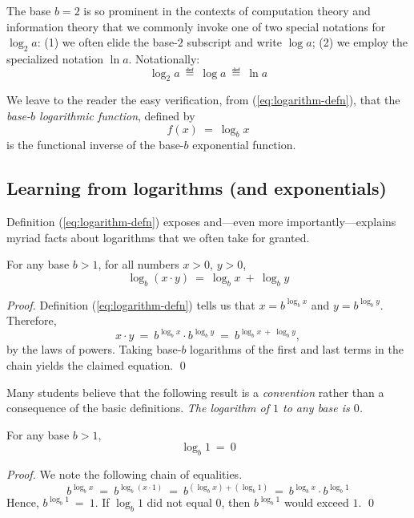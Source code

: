 The base $b = 2$ is so prominent in the contexts of computation theory
and information theory that we commonly invoke one of two special
notations for $\log_2 a$: (1) we often elide the base-$2$ subscript
and write $\log a$;
(2) we employ the specialized notation $\ln a$.  Notationally:
\[ \log_2 a \ \eqdef \ \log a \ \eqdef \ \ln a \]

We leave to the reader the easy verification, from
(\ref{eq:logarithm-defn}), that the {\it base-$b$ logarithmic
  function}, defined by
\begin{equation}
\label{eq:log-function-defn}
f(x) \ = \ \log_b x
\end{equation}
is the functional inverse of the base-$b$ exponential function.

\subsection{Learning from logarithms (and exponentials)}

Definition (\ref{eq:logarithm-defn}) exposes and---even more
importantly---explains myriad facts about logarithms that we often
take for granted.

\begin{prop}
For any base $b >1$, for all numbers $x >0$, $y>0$,
\[ \log_b (x \cdot y) \ = \ \log_b x \ + \ \log_b y \]
\end{prop}

\begin{proof}
Definition (\ref{eq:logarithm-defn}) tells us that $x = b^{\log_b x}$
and $y = b^{\log_b y}$.  Therefore,
\[ x \cdot y \ = \ b^{\log_b x} \cdot b^{\log_b y} \ = \
b^{\log_b x \ + \ \log_b y}, \]
by the laws of powers.  Taking base-$b$ logarithms of the first and
last terms in the chain yields the claimed equation.
\qed
\end{proof}



Many students believe that the following result is a {\em convention}
rather than a consequence of the basic definitions.  {\em The logarithm
  of $1$ to any base is $0$.}

\begin{prop}
For any base $b >1$,
\[ \log_b 1 \ = \ 0 \]
\end{prop}

\begin{proof}
We note the following chain of equalities.
\[  b^{\log_b x} \ = \ b^{\log_b (x \cdot 1)} 
\ = \ b^{(\log_b x) + (\log_b 1)} 
\ = \ b^{\log_b x} \cdot b^{\log_b 1}
\]
Hence, $b^{\log_b 1} \ = \ 1$.  If $\log_b 1$ did not equal $0$, then
$b^{\log_b 1}$ would exceed $1$.  \qed
\end{proof}

